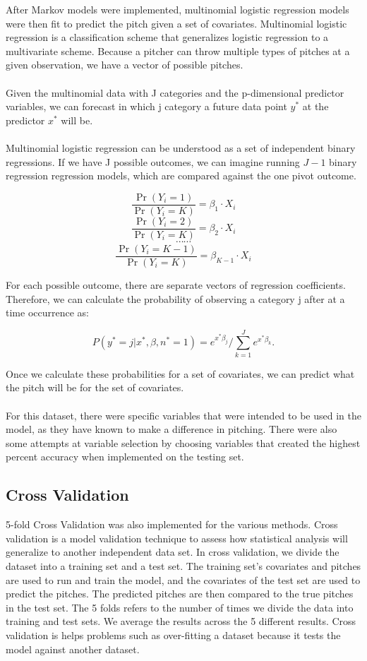 \documentclass{article}
\begin{document}
After Markov models were implemented, multinomial logistic regression models were then fit to predict the pitch given a set of covariates. Multinomial logistic regression is a classification scheme that generalizes logistic regression to a multivariate scheme. Because a pitcher can throw multiple types of pitches at a given observation, we have a vector of possible pitches. \\
\\ 
Given the multinomial data with J categories and the p-dimensional predictor variables, we can forecast in which j category a future data point $y^*$ at the predictor $x^*$ will be. \\
\\
Multinomial logistic regression can be understood as a set of independent binary regressions. If we have J possible outcomes, we can imagine running $J-1$ binary regression regression models, which are compared against the one pivot outcome. 

$$ \frac{\Pr(Y_i=1)}{\Pr(Y_i=K)} = \beta_1 \cdot {X}_i $$
$$ \frac{\Pr(Y_i=2)}{\Pr(Y_i=K)} = \beta_2 \cdot {X}_i $$
$$ \cdots \cdots$$ 
$$ \frac{\Pr(Y_i=K-1)}{\Pr(Y_i=K)} = \beta_{K-1} \cdot {X}_i$$ 

\noindent For each possible outcome, there are separate vectors of regression coefficients. Therefore, we can calculate the probability of observing a category j after at a time occurrence as: 

$$ P(y^* = j | x^*, \beta, n^* = 1 ) = e^{x^* \beta_j} / \sum_{k=1}^{J} e^{x^* \beta_k}. $$

\noindent Once we calculate these probabilities for a set of covariates, we can predict what the pitch will be for the set of covariates.  \\ 
\\ 
For this dataset, there were specific variables that were intended to be used in the model, as they have known to make a difference in pitching. There were also some attempts at variable selection by choosing variables that created the highest percent accuracy when implemented on the testing set. 

\subsection{Cross Validation}

5-fold Cross Validation was also implemented for the various methods. Cross validation is a model validation technique to assess how statistical analysis will generalize to another independent data set. In cross validation, we divide the dataset into a training set and a test set. The training set's covariates and pitches are used to run and train the model, and the covariates of the test set are used to predict the pitches. The predicted pitches are then compared to the true pitches in the test set. The 5 folds refers to the number of times we divide the data into training and test sets. We average the results across the 5 different results. Cross validation is helps problems such as over-fitting a dataset because it tests the model against another dataset. 
\end{document}
